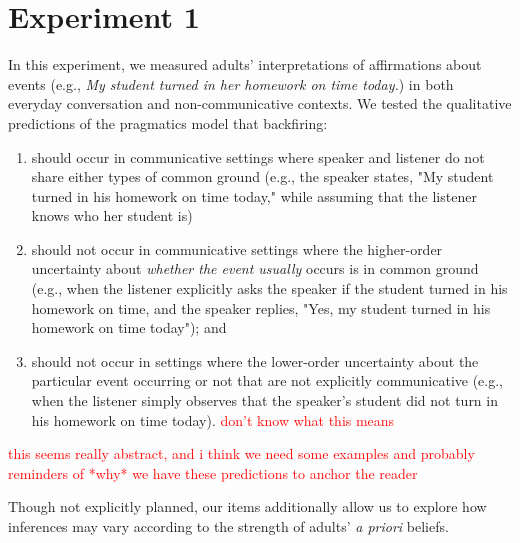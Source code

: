 \documentclass[10pt,letterpaper]{article}
\newcommand{\red}[1]{\textcolor{Red}{#1}}
\begin{document}
\section{Experiment 1}

In this experiment, we measured adults' interpretations of affirmations about events (e.g., \emph{My student turned in her homework on time today.}) in both everyday conversation and non-communicative contexts.  We tested the qualitative predictions of the pragmatics model that backfiring:
\begin{enumerate}
\item should occur in communicative settings where speaker and listener do not share either types of common ground (e.g., the speaker states, "My student turned in his homework on time today," while assuming that the listener knows who her student is)
\item should not occur in communicative settings where the higher-order uncertainty about \emph{whether the event usually} occurs is in common ground (e.g., when the listener explicitly asks the speaker if the student turned in his homework on time, and the speaker replies, "Yes, my student turned in his homework on time today"); and 
\item should not occur in settings where the lower-order uncertainty about the particular event occurring or not that are not explicitly communicative (e.g., when the listener simply observes that the speaker's student did not turn in his homework on time today). \red{don't know what this means}
\end{enumerate}


\red{this seems really abstract, and i think we need some examples and probably reminders of *why* we have these predictions to anchor the reader}

Though not explicitly planned, our items additionally allow us to explore how inferences may vary according to the strength of adults' \emph{a priori} beliefs.

\end{document}
